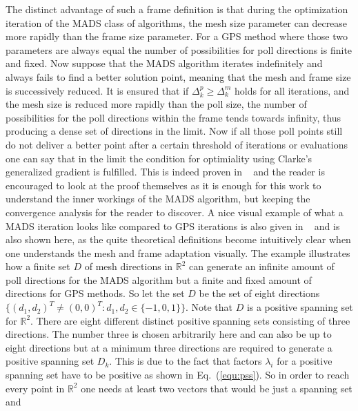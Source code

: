\documentclass[a4paper,10pt]{article}
\newcommand{\equref}[1]{Eq.~(\ref{#1})}
\begin{document}
    The distinct advantage of such a frame definition is that during the 
    optimization iteration of the MADS class of algorithms, the mesh size
    parameter can decrease more rapidly than the frame size parameter.
    For a GPS method where those two parameters are always equal the number
    of possibilities for poll directions is finite and fixed.
    Now suppose that the MADS algorithm iterates indefinitely and always
    fails to find a better solution point, meaning that the mesh
    and frame size is successively reduced.
    It is ensured that if $\Delta^p_k \geq \Delta^m_k$ holds for all iterations,
    and the mesh size is reduced more rapidly than the poll size,
    the number of possibilities for the poll directions within the frame tends
    towards infinity, thus producing a dense set of directions in the limit.
    Now if all those poll points still do not deliver a better point
    after a certain threshold of iterations or evaluations one can say
    that in the limit the condition for optimiality using Clarke's
    generalized gradient is fulfilled.
    This is indeed proven in ~\cite{mads_original} and the reader is
    encouraged to look at the proof themselves as it is enough for this
    work to understand the inner workings of the MADS algorithm,
    but keeping the convergence analysis for the reader to discover.   
    A nice visual example of what a MADS iteration looks like compared
    to GPS iterations is also given in ~\cite{mads_original} and is
    also shown here, as the quite theoretical definitions become
    intuitively clear when one understands the mesh and frame adaptation
    visually.
    The example illustrates how a finite set $D$ of mesh directions in
    $\mathbb{R}^2$ can generate an infinite amount of poll directions
    for the MADS algorithm but a finite and fixed amount of directions
    for GPS methods.
    So let the set $D$ be the set of eight directions 
    $\{(d_1,d_2)^T \neq (0,0)^T : d_1,d_2 \in \{-1,0,1\}\}$.
    Note that $D$ is a positive spanning set for $\mathbb{R}^2$.
    There are eight different distinct positive spanning sets 
    consisting of three directions.
    The number three is chosen arbitrarily here and can also be
    up to eight directions but at a minimum three directions are 
    required to generate a positive spanning set $D_k$.
    This is due to the fact that factors $\lambda_i$ for a 
    positive spanning set have to be positive as shown in \equref{equ:pss}.
    So in order to reach every point in $\mathbb{R}^2$ one needs at
    least two vectors that would be just a spanning set and 
\end{document}
